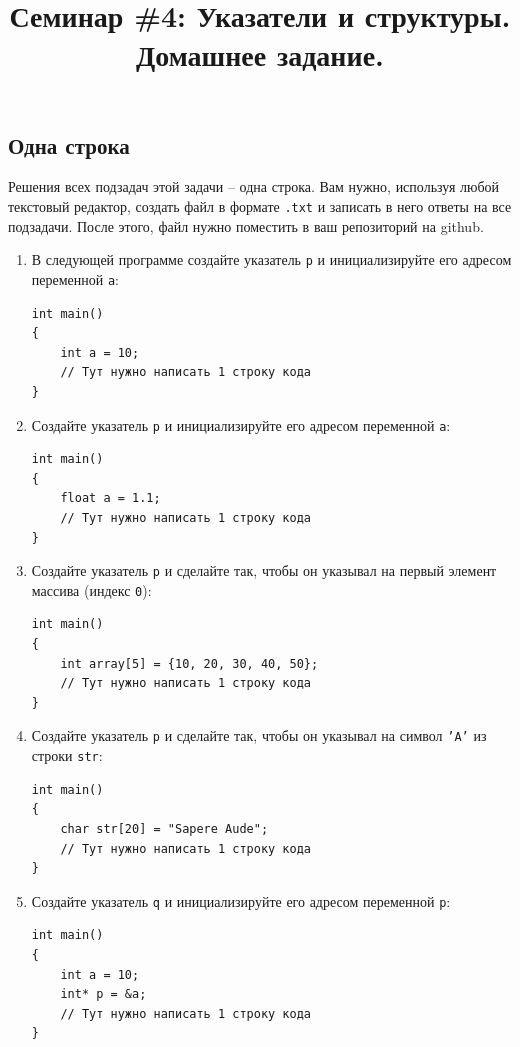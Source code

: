 \documentclass[10pt]{article}
\begin{document}
\title{Семинар \#4: Указатели и структуры. Домашнее задание. \vspace{-5ex}}\date{}\maketitle

\subsection{Одна строка}
Решения всех подзадач этой задачи -- одна строка. Вам нужно, используя любой текстовый редактор, создать файл в формате \texttt{.txt} и записать в него ответы на все подзадачи. После этого, файл нужно поместить в ваш репозиторий на github.

\begin{enumerate}
\item В следующей программе создайте указатель \texttt{p} и инициализируйте его адресом переменной \texttt{a}:
\begin{lstlisting}
int main() 
{
    int a = 10;
    // Тут нужно написать 1 строку кода
}
\end{lstlisting}

\item Создайте указатель \texttt{p} и инициализируйте его адресом переменной \texttt{a}:
\begin{lstlisting}
int main() 
{
    float a = 1.1;
    // Тут нужно написать 1 строку кода
}
\end{lstlisting}


\item Создайте указатель \texttt{p} и сделайте так, чтобы он указывал на первый элемент массива (индекс \texttt{0}):
\begin{lstlisting}
int main() 
{
    int array[5] = {10, 20, 30, 40, 50};
    // Тут нужно написать 1 строку кода
}
\end{lstlisting}


\item Создайте указатель \texttt{p} и сделайте так, чтобы он указывал на символ \texttt{'A'}  из строки \texttt{str}:
\begin{lstlisting}
int main() 
{
    char str[20] = "Sapere Aude";
    // Тут нужно написать 1 строку кода
}
\end{lstlisting}

\item Создайте указатель \texttt{q} и инициализируйте его адресом переменной \texttt{p}:
\begin{lstlisting}
int main() 
{
    int a = 10;
    int* p = &a;
    // Тут нужно написать 1 строку кода
}
\end{lstlisting}


\end{enumerate}
\end{document}
